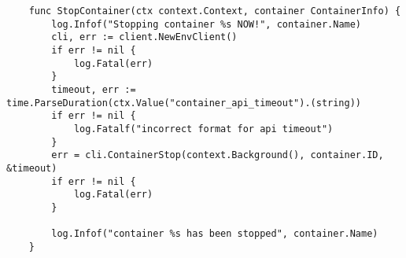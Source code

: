 \begin{verbatim}
    func StopContainer(ctx context.Context, container ContainerInfo) {
        log.Infof("Stopping container %s NOW!", container.Name)
        cli, err := client.NewEnvClient()
        if err != nil {
            log.Fatal(err)
        }
        timeout, err := time.ParseDuration(ctx.Value("container_api_timeout").(string))
        if err != nil {
            log.Fatalf("incorrect format for api timeout")
        }
        err = cli.ContainerStop(context.Background(), container.ID, &timeout)
        if err != nil {
            log.Fatal(err)
        }
    
        log.Infof("container %s has been stopped", container.Name)
    }
    
    
\end{verbatim}



